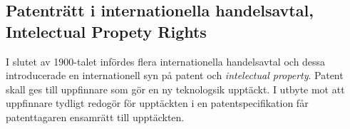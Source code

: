 \subsection{Patenträtt i internationella handelsavtal, Intelectual Propety Rights}

I slutet av 1900-talet infördes flera internationella handelsavtal och dessa introducerade en
internationell syn på patent och \emph{intelectual property}. Patent skall ges till uppfinnare som gör en
ny teknologsik upptäckt. I utbyte mot att uppfinnare tydligt redogör för upptäckten i en
patentspecifikation får patenttagaren ensamrätt till upptäckten. %


%
%
%

